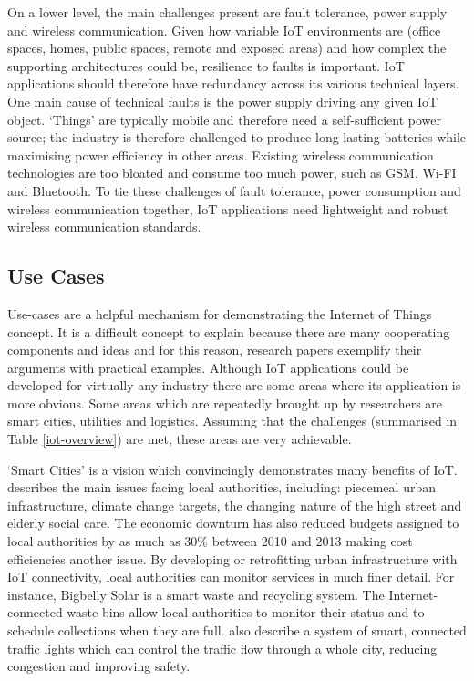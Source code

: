         On a lower level, the main challenges present are fault tolerance, power supply and wireless communication. Given how variable IoT environments are (office spaces, homes, public spaces, remote and exposed areas) and how complex the supporting architectures could be, resilience to faults is important. IoT applications should therefore have redundancy across its various technical layers. One main cause of technical faults is the power supply driving any given IoT object. `Things' are typically mobile and therefore need a self-sufficient power source; the industry is therefore challenged to produce long-lasting batteries while maximising power efficiency in other areas. Existing wireless communication technologies are too bloated and consume too much power, such as GSM, Wi-FI and Bluetooth. To tie these challenges of fault tolerance, power consumption and wireless communication together, IoT applications need lightweight and robust wireless communication standards.

    \subsection{Use Cases}
      Use-cases are a helpful mechanism for demonstrating the Internet of Things concept. It is a difficult concept to explain because there are many cooperating components and ideas and for this reason, research papers exemplify their arguments with practical examples. Although IoT applications could be developed for virtually any industry there are some areas where its application is more obvious. Some areas which are repeatedly brought up by researchers are smart cities, utilities and logistics. Assuming that the challenges (summarised in Table \ref{iot-overview}) are met, these areas are very achievable.

      `Smart Cities' is a vision which convincingly demonstrates many benefits of IoT. \citet{DfBIS:2013} describes the main issues facing local authorities, including: piecemeal urban infrastructure, climate change targets, the changing nature of the high street and elderly social care. The economic downturn has also reduced budgets assigned to local authorities by as much as 30\% between 2010 and 2013 making cost efficiencies another issue. By developing or retrofitting urban infrastructure with IoT connectivity, local authorities can monitor services in much finer detail. For instance, Bigbelly Solar is a smart waste and recycling system. The Internet-connected waste bins allow local authorities to monitor their status and to schedule collections when they are full. \citet{fog:2012} also describe a system of smart, connected traffic lights which can control the traffic flow through a whole city, reducing congestion and improving safety.  

